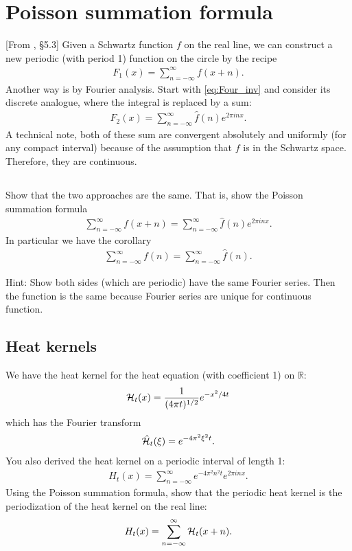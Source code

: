 \documentclass[11pt,letterpaper]{report}
\begin{document}
\section{Poisson summation formula}
[From \cite{SteinShakarchi_03}, \S5.3] Given a Schwartz function $f$ on the real line, we can construct a new periodic (with period 1) function on the circle by the recipe
\begin{align}
    F_1(x) = \sum_{n=-\infty}^\infty f(x+n).
\end{align}
Another way is by Fourier analysis. Start with \eqref{eq:Four_inv} and consider its discrete analogue, where the integral is replaced by a sum:
\begin{align}
    F_2(x) = \sum_{n=-\infty}^\infty \hat f(n)e^{2\pi inx}.
\end{align}
A technical note, both of these sum are convergent absolutely and uniformly (for any compact interval) because of the assumption that $f$ is in the Schwartz space. Therefore, they are continuous. 

\subsection{}
Show that the two approaches are the same. That is, show the Poisson summation formula
\begin{align}
    \sum_{n=-\infty}^\infty f(x+n) = \sum_{n=-\infty}^\infty \hat f(n)e^{2\pi inx}.
\end{align}
In particular we have the corollary
\begin{align}
    \sum_{n=-\infty}^\infty f(n) = \sum_{n=-\infty}^\infty \hat f(n).
\end{align}

Hint: Show both sides (which are periodic) have the same Fourier series. Then the function is the same because Fourier series are unique for continuous function.

\subsection{Heat kernels} We have the heat kernel for the heat equation (with coefficient 1) on $\mathbb{R}$:
\begin{align}
    \mathcal{H}_t(x) = \frac{1}{(4\pi t)^{1/2}}e^{-x^2/4t}
\end{align}
which has the Fourier transform
\begin{align}
    \hat{\mathcal{H}}_t(\xi) = e^{-4\pi^2 \xi^2 t}.
\end{align}
You also derived the heat kernel on a periodic interval of length 1:
\begin{align}
    H_t(x) = \sum_{n=-\infty}^\infty e^{-4\pi^2 n^2 t}e^{2\pi inx}.
\end{align}
Using the Poisson summation formula, show that the periodic heat kernel is the periodization of the
heat kernel on the real line:
\begin{align}
    H_t(x) = \sum_{n=-\infty}^\infty \mathcal{H}_t(x+n).
\end{align}
\end{document}
